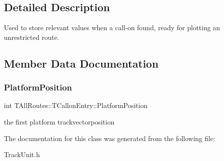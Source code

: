\subsection{Detailed Description}
Used to store relevant values when a call-\/on found, ready for plotting an unrestricted route. 

\subsection{Member Data Documentation}
\mbox{\label{class_t_all_routes_1_1_t_callon_entry_a538fe345a1cd31068c96302ef0055bd3}} 
\subsubsection{\texorpdfstring{Platform\+Position}{PlatformPosition}}
{\footnotesize\ttfamily int T\+All\+Routes\+::\+T\+Callon\+Entry\+::\+Platform\+Position}

the first platform trackvectorposition 

The documentation for this class was generated from the following file\+:\begin{DoxyCompactItemize}
\item 
Track\+Unit.\+h\end{DoxyCompactItemize}

